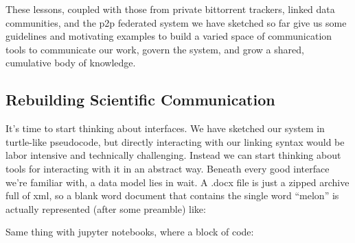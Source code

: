 These lessons, coupled with those from private bittorrent trackers,
linked data communities, and the p2p federated system we have sketched
so far give us some guidelines and motivating examples to build a varied
space of communication tools to communicate our work, govern the system,
and grow a shared, cumulative body of knowledge.

\hypertarget{rebuilding-scientific-communication}{%
\subsection{Rebuilding Scientific
Communication}\label{rebuilding-scientific-communication}}

It's time to start thinking about interfaces. We have sketched our
system in turtle-like pseudocode, but directly interacting with our
linking syntax would be labor intensive and technically challenging.
Instead we can start thinking about tools for interacting with it in an
abstract way. Beneath every good interface we're familiar with, a data
model lies in wait. A .docx file is just a zipped archive full of xml,
so a blank word document that contains the single word ``melon'' is
actually represented (after some preamble) like:

\begin{Shaded}
\begin{Highlighting}[]
\NormalTok{\textless{}}\NormalTok{\textgreater{}}
\NormalTok{  \textless{}} 
\NormalTok{\textgreater{}}
\NormalTok{    \textless{}}\NormalTok{\textgreater{}}
\NormalTok{        \textless{}}\NormalTok{\textgreater{}}
\NormalTok{    \textless{}/}\NormalTok{\textgreater{}}
\NormalTok{  \textless{}/}\NormalTok{\textgreater{}  }
\NormalTok{\textless{}/}\NormalTok{\textgreater{}}
\end{Highlighting}
\end{Shaded}

Same thing with jupyter notebooks, where a block of code:

\begin{Shaded}
\begin{Highlighting}[]
\OperatorTok{\textgreater{}\textgreater{}\textgreater{}}\OperatorTok{=} 
\OperatorTok{\textgreater{}\textgreater{}\textgreater{}} \NormalTok{(}\SpecialCharTok{\{}\SpecialCharTok{\}}\SpecialStringTok{\textquotesingle{}}\NormalTok{)}
\end{Highlighting}
\end{Shaded}

